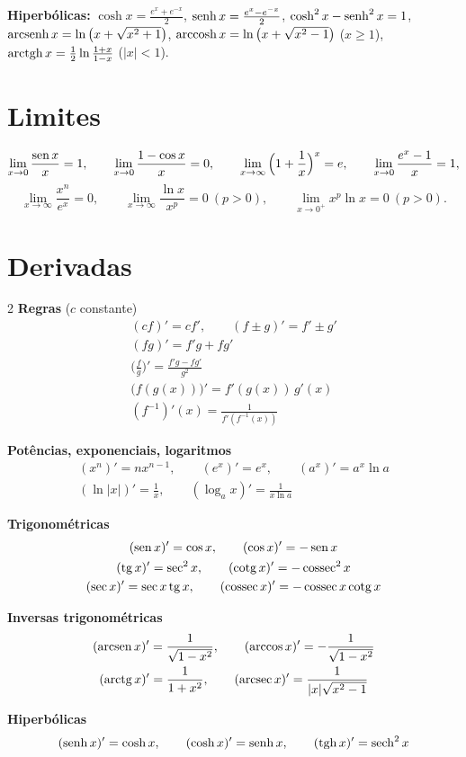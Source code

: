 {\small\textbf{Hiperbólicas:} $\cosh x=\frac{e^x+e^{-x}}2$, $\operatorname{senh} x=\frac{e^x-e^{-x}}2$,
$\cosh^2x-\operatorname{senh}^2x=1$, $\operatorname{arcsenh} x=\ln\big(x+\sqrt{x^2+1}\big)$,
$\operatorname{arccosh} x=\ln\big(x+\sqrt{x^2-1}\big)$ ($x\ge1$), $\operatorname{arctgh} x=\frac12\ln\frac{1+x}{1-x}$ ($|x|<1$).}

\section{Limites}
{\small
\[
\lim_{x\to0}\frac{\operatorname{sen} x}x=1,\qquad \lim_{x\to0}\frac{1-\cos x}x=0,\qquad
\lim_{x\to\infty}\Big(1+\frac1x\Big)^x=e,\qquad \lim_{x\to0}\frac{e^x-1}x=1,
\]
\[
\lim_{x\to\infty}\frac{x^n}{e^x}=0,\qquad \lim_{x\to\infty}\frac{\ln x}{x^p}=0\ (p>0),\qquad
\lim_{x\to0^+}x^p\ln x=0\ (p>0).
\]}

\section{Derivadas}
\begin{multicols}{2}\small
\textbf{Regras} ($c$ constante)
\begin{gather*}
(cf)'=cf',\qquad (f\pm g)'=f'\pm g'\\
(fg)'=f'g+fg'\\
\Big(\frac fg\Big)'=\frac{f'g-fg'}{g^2}\\
\big(f(g(x))\big)'=f'(g(x))\,g'(x)\\
(f^{-1})'(x)=\frac1{f'(f^{-1}(x))}
\end{gather*}

\textbf{Potências, exponenciais, logaritmos}
\begin{gather*}
(x^n)'=nx^{n-1},\qquad (e^x)'=e^x,\qquad (a^x)'=a^x\ln a\\
(\ln|x|)'=\frac1x,\qquad (\log_ax)'=\frac1{x\ln a}
\end{gather*}

\columnbreak
\textbf{Trigonométricas}
\begin{gather*}
(\operatorname{sen} x)'=\cos x,\qquad (\cos x)'=-\operatorname{sen} x\\
(\operatorname{tg} x)'=\sec^2x,\qquad (\operatorname{cotg} x)'=-\operatorname{cossec}^2x\\
(\sec x)'=\sec x\operatorname{tg} x,\qquad (\operatorname{cossec} x)'=-\operatorname{cossec} x\operatorname{cotg} x
\end{gather*}

\textbf{Inversas trigonométricas}
\begin{gather*}
(\operatorname{arcsen} x)'=\frac1{\sqrt{1-x^2}},\qquad (\arccos x)'=-\frac1{\sqrt{1-x^2}}\\
(\operatorname{arctg} x)'=\frac1{1+x^2},\qquad (\operatorname{arcsec} x)'=\frac1{|x|\sqrt{x^2-1}}
\end{gather*}

\textbf{Hiperbólicas}
\begin{gather*}
(\operatorname{senh} x)'=\cosh x,\qquad (\cosh x)'=\operatorname{senh} x,\qquad (\operatorname{tgh} x)'=\operatorname{sech}^2x
\end{gather*}
\end{multicols}


